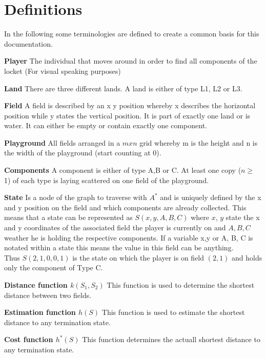 \documentclass{article}
\begin{document}
\section{Definitions}
In the following some terminologies are defined to create a common basis for this documentation.
\begin{description}
    \item{\textbf{Player}} The individual that moves around in order to find all components of the locket (For visual speaking purposes)
    \item{\textbf{Land}} There are three different lands. A land is either of type L1, L2 or L3.
    \item{\textbf{Field}} A field is described by an x y position whereby x describes the horizontal position while y states the vertical position. It is part of exactly one land or is water. It can either be empty or contain exactly one component.
    \item{\textbf{Playground}} All fields arranged in a $m x n$ grid whereby m is the height and n is the width of the playground (start counting at 0).
    \item{\textbf{Components}} A component is either of type A,B or C. At least one copy ($n \geq \ $1) of each type is laying scattered on one field of the playground.
    \item{\textbf{State}\label{definition_state}}  Is a node of the graph to traverse with $A^*$ and is uniquely defined by the x and y position on the field and which components are already collected. 
    This means that a state can be represented as $S(x,y,A,B,C)$ where $x$, $y$ state the x and y coordinates of the associated field the player is currently on and $A, B, C$ weather he is holding the respective components. If a variable x,y or A, B, C is notated within a state this means the value in this field can be anything.\\
    Thus $S(2,1,0,0,1)$ is the state on which the player is on field $(2,1)$ and holds only the component of Type C.
    \item\textbf{ Distance function $k(S_1, S_2)$} This function is used to determine the shortest distance between two fields.
    \item \textbf{Estimation function {$h(S)$}} This function is used to estimate the shortest distance to any termination state.
    \item \textbf{Cost function {$h^*(S)$}} This function determines the actuall shortest distance to any termination state.
\end{description}
\end{document}
